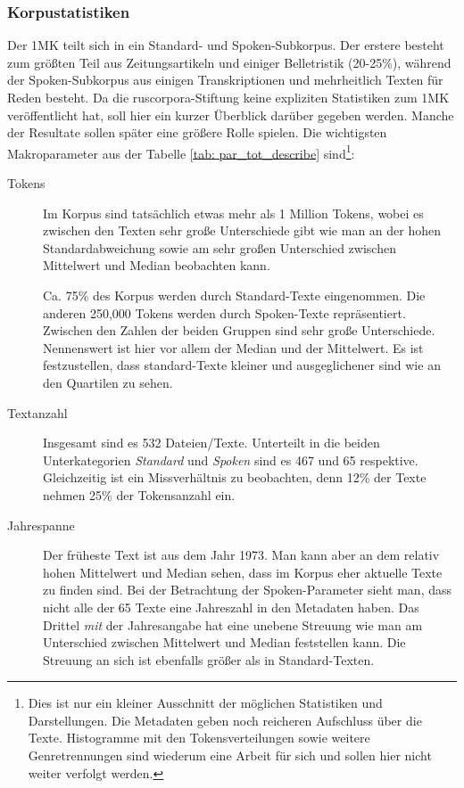 \documentclass[12pt,headsepline,a4paper]{scrartcl}
\begin{document}
\subsubsection{Korpustatistiken}
\label{sec:corp_stats}
Der 1MK teilt sich in ein Standard- und Spoken-Subkorpus. Der erstere besteht zum größten Teil aus Zeitungsartikeln und einiger Belletristik (20-25\%), während der Spoken-Subkorpus aus einigen Transkriptionen und mehrheitlich Texten für Reden besteht.
Da die ruscorpora-Stiftung keine expliziten Statistiken zum 1MK veröffentlicht hat, soll hier ein kurzer Überblick darüber gegeben werden. Manche der Resultate sollen später eine größere Rolle spielen.
Die wichtigsten Makroparameter aus der Tabelle \ref{tab: par_tot_describe} sind\footnote{Dies ist nur ein kleiner Ausschnitt der möglichen Statistiken und Darstellungen. Die Metadaten geben noch reicheren Aufschluss über die Texte. Histogramme mit den Tokensverteilungen sowie weitere Genretrennungen sind wiederum eine Arbeit für sich und sollen hier nicht weiter verfolgt werden.}:
\begin{description}

  \item[Tokens]
  Im Korpus sind tatsächlich etwas mehr als 1 Million Tokens, wobei es zwischen den Texten sehr große Unterschiede gibt wie man an der hohen Standardabweichung sowie am sehr großen Unterschied zwischen Mittelwert und Median beobachten kann.

 Ca. 75\% des Korpus werden durch Standard-Texte eingenommen. Die anderen 250,000 Tokens werden durch Spoken-Texte repräsentiert. 
Zwischen den Zahlen der beiden Gruppen sind sehr große Unterschiede. Nennenswert ist hier vor allem der Median und der Mittelwert. Es ist festzustellen, dass standard-Texte kleiner und ausgeglichener sind wie an den Quartilen zu sehen.

  \item[Textanzahl] Insgesamt sind es 532 Dateien/Texte. Unterteilt in die beiden Unterkategorien \textit{Standard} und \textit{Spoken} sind es 467 und 65 respektive. Gleichzeitig ist ein Missverhältnis zu beobachten, denn 12\% der Texte nehmen 25\% der Tokensanzahl ein.

  \item[Jahrespanne] Der früheste Text ist aus dem Jahr 1973. Man kann aber an dem relativ hohen Mittelwert und Median sehen, dass im Korpus eher aktuelle Texte zu finden sind.
Bei der Betrachtung der Spoken-Parameter sieht man, dass nicht alle der 65 Texte eine Jahreszahl in den Metadaten haben. Das Drittel \textit{mit} der Jahresangabe hat eine unebene Streuung wie man am Unterschied zwischen Mittelwert und Median feststellen kann. Die Streuung an sich ist ebenfalls größer als in Standard-Texten.

\end{description}
\end{document}
